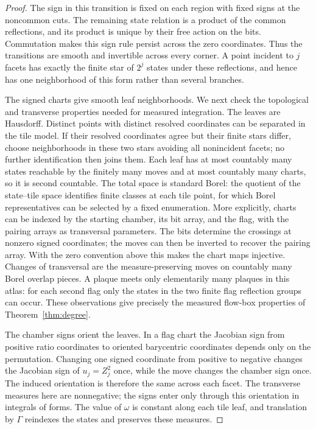 \begin{proof}
The sign in this transition is fixed on each region with fixed signs
at the noncommon cuts.  The remaining state relation is a product of
the common reflections, and its product is unique by their free
action on the bits.  Commutation makes this sign rule persist across
the zero coordinates.  Thus the transitions are smooth and invertible
across every corner.  A point incident to \(j\) facets has exactly the
finite star of \(2^j\) states under these reflections, and hence has
one neighborhood of this form rather than several branches.

The signed charts give smooth leaf neighborhoods.  We next check the
topological and transverse properties needed for measured integration.
The leaves are Hausdorff.  Distinct
points with distinct resolved coordinates can be separated in the
tile model.  If their resolved coordinates agree but their finite
stars differ, choose neighborhoods in these two stars avoiding all
nonincident facets; no further identification then joins them.
Each leaf has at most countably many states reachable by the finitely
many moves and at most countably many charts, so it is second countable.
The total space is standard Borel: the quotient of the state--tile
space identifies finite classes at each tile point, for which Borel
representatives can be selected by a fixed enumeration.  More
explicitly, charts can be indexed by the starting chamber, its bit
array, and the flag, with the pairing arrays as transversal parameters.
The bits determine the crossings at nonzero signed coordinates; the
moves can then be inverted to recover the pairing array.  With the
zero convention above this makes the chart maps injective.  Changes
of transversal are the measure-preserving moves on countably many
Borel overlap pieces.  A plaque meets only elementarily many plaques
in this atlas: for each second flag only the states in the two finite
flag reflection groups can occur.  These observations give precisely
the measured flow-box properties of Theorem~\ref{thm:degree}.

The chamber signs orient the leaves.  In a flag chart the Jacobian
sign from positive ratio coordinates to oriented barycentric
coordinates depends only on the permutation.  Changing one signed
coordinate from positive to negative changes the Jacobian sign of
\(u_j=Z_j^2\) once, while the move changes the chamber sign once.
The induced orientation is therefore the same across each facet.
The transverse measures here are nonnegative; the signs enter only
through this orientation in integrals of forms.  The value of
\(\omega\) is constant along each tile leaf, and translation by
\(\Gamma\) reindexes the states and preserves these measures.


\end{proof}
